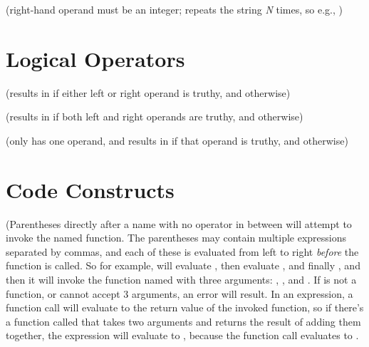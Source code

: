 \documentclass{handout}
\begin{document}
\noindent
\code{*}  (right-hand operand must be an integer; repeats the string \emph{N} times, so e.g., )

\section{Logical Operators}

\noindent
{}  (results in  if either left or right operand is truthy, and  otherwise)

\noindent
{}  (results in  if both left and right operands are truthy, and  otherwise)

\noindent
{}  (only has one operand, and results in  if that operand is truthy, and  otherwise)

\noindent
{}

%
%
%
%

%
%

\section{Code Constructs}

  (Parentheses directly after a name with no operator in between will attempt to invoke the named function. The parentheses may contain multiple expressions separated by commas, and each of these is evaluated from left to right \emph{before} the function is called. So for example,  will evaluate , then evaluate , and finally , and then it will invoke the function named  with three arguments: , , and . If  is not a function, or cannot accept 3 arguments, an error will result. In an expression, a function call will evaluate to the return value of the invoked function, so if there's a function called  that takes two arguments and returns the result of adding them together, the expression  will evaluate to , because the function call evaluates to .
\end{document}
